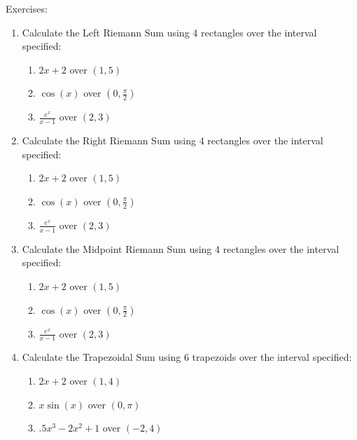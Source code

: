 \documentclass[../revisedmain.tex]{subfiles}
\begin{document}
\begin{center}
\LARGE Exercises:
\end{center}
\begin{enumerate}
	\item Calculate the Left Riemann Sum using 4 rectangles over the interval specified:
	\begin{enumerate}
		\item $2x+2$ over $(1,5)$
		\item $\cos(x)$ over $(0,\frac{\pi}{2})$
		\item $\frac{e^x}{x-1}$ over $(2,3)$
	\end{enumerate}
	\item Calculate the Right Riemann Sum using 4 rectangles over the interval specified:
	\begin{enumerate}
		\item $2x+2$ over $(1,5)$
		\item $\cos(x)$ over $(0,\frac{\pi}{2})$
		\item $\frac{e^x}{x-1}$ over $(2,3)$
	\end{enumerate}
	\item Calculate the Midpoint Riemann Sum using 4 rectangles over the interval specified:
	\begin{enumerate}
		\item $2x+2$ over $(1,5)$
		\item $\cos(x)$ over $(0,\frac{\pi}{2})$
		\item $\frac{e^x}{x-1}$ over $(2,3)$
	\end{enumerate}
	\item Calculate the Trapezoidal Sum using 6 trapezoids over the interval specified:
	\begin{enumerate}
		\item $2x+2$ over $(1,4)$
		\item $x\sin(x)$ over $(0,\pi)$
		\item $.5x^3-2x^2+1$ over $(-2,4)$
	\end{enumerate}
\end{enumerate}
\end{document}
